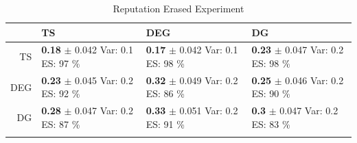 \documentclass{article}
\theoremstyle{definition}
\begin{document}
\begin{table}[ht]
\centering
\caption{Reputation Erased Experiment} 
\begin{tabular}{rlll}
  \hline
 & TS & DEG &  DG \\ 
  \hline
TS & \makecell{ \textbf{ 0.18 } $\pm$ 0.042 \\Var:  0.1 \\ ES: 97 \% } & \makecell{ \textbf{ 0.17 } $\pm$ 0.042 \\Var:  0.1 \\ ES: 98 \% } & \makecell{ \textbf{ 0.23 } $\pm$ 0.047 \\Var:  0.2 \\ ES: 98 \% } \\ 
  DEG & \makecell{ \textbf{ 0.23 } $\pm$ 0.045 \\Var:  0.2 \\ ES: 92 \% } & \makecell{ \textbf{ 0.32 } $\pm$ 0.049 \\Var:  0.2 \\ ES: 86 \% } & \makecell{ \textbf{ 0.25 } $\pm$ 0.046 \\Var:  0.2 \\ ES: 90 \% } \\ 
   DG & \makecell{ \textbf{ 0.28 } $\pm$ 0.047 \\Var:  0.2 \\ ES: 87 \% } & \makecell{ \textbf{ 0.33 } $\pm$ 0.051 \\Var:  0.2 \\ ES: 91 \% } & \makecell{ \textbf{ 0.3 } $\pm$ 0.047 \\Var:  0.2 \\ ES: 83 \% } \\ 
   \hline
   \label{rep_erase}
\end{tabular}
\end{table}
\end{document}
